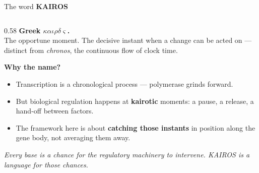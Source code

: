 \documentclass[aspectratio=169,11pt]{beamer}
\newcommand{\smallKAIROS}{{\color{KGold}\bfseries KAIROS}}
\newcommand{\goldbf}[1]{{\color{KGold}\bfseries #1}}
\newcommand{\skyit}[1]{{\color{KSky}\itshape #1}}
\newcommand{\creambf}[1]{{\color{KCream}\bfseries #1}}
\begin{document}
\begin{frame}{The word \smallKAIROS}
\begin{columns}[T,onlytextwidth]
\begin{column}{0.58\textwidth}
  \vspace{0.4em}
  {\color{KGold}\bfseries\small Greek {\boldmath$\kappa\alpha\iota\rho\delta\varsigma$}.}\\[0.25em]
  {\color{KWhite}\small The opportune moment. The decisive instant when a
  change can be acted on --- distinct from \skyit{chronos}, the continuous
  flow of clock time.}
  \medskip

  {\color{KGold}\bfseries\small Why the name?}
  \begin{itemize}
    \setlength{\itemsep}{0.25em}
    \item Transcription is a chronological process --- polymerase grinds forward.
    \item But biological regulation happens at \creambf{kairotic} moments:
          a pause, a release, a hand-off between factors.
    \item The framework here is about \goldbf{catching those instants} in
          position along the gene body, not averaging them away.
  \end{itemize}
  \medskip

  {\color{KCream}\itshape\small
  Every base is a chance for the regulatory machinery to intervene.
  KAIROS is a language for those chances.}
\end{column}
\end{columns}
\end{frame}
\end{document}
